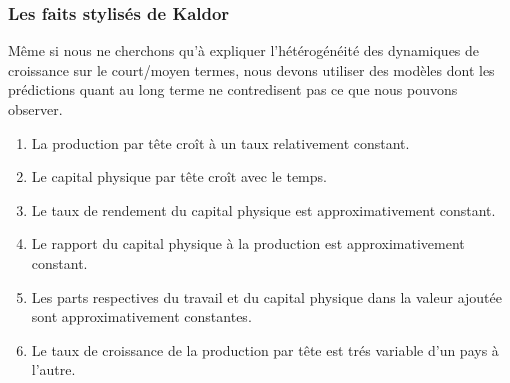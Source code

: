 \documentclass[10pt,notheorems]{beamer}
\theoremstyle{plain}
\theoremstyle{definition} %
\begin{document}
\begin{frame}
  \frametitle{Les faits stylisés de Kaldor}

  Même si nous ne cherchons qu'à expliquer l'hétérogénéité des
  dynamiques de croissance sur le court/moyen termes, nous devons
  utiliser des modèles dont les prédictions quant au long terme ne
  contredisent pas ce que nous pouvons observer.\newline

  \begin{enumerate}

  \item La production par tête croît à un taux relativement constant.

  \item Le capital physique par tête croît avec le temps.

  \item Le taux de rendement du capital physique est approximativement constant.

  \item Le rapport du capital physique à la production est approximativement constant.

  \item Les parts respectives du travail et du capital physique dans la valeur ajoutée sont approximativement constantes.

  \item Le taux de croissance de la production par tête est trés variable d'un pays à l'autre.
  \end{enumerate}

\end{frame}
\end{document}
